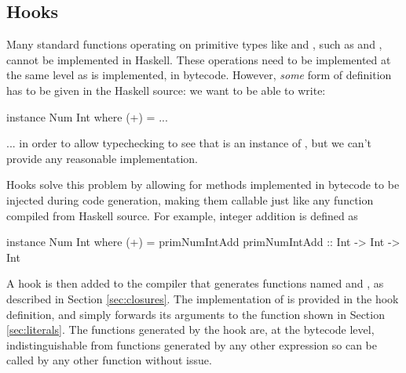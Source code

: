\documentclass[dissertation.tex]{subfiles}
\begin{document}
{    \subsection{Hooks}\label{sec:hooks}
    {

        Many standard functions operating on primitive types like  and , such as
        \haskell{(+)} and \haskell{(==)}, cannot be implemented in Haskell. These operations need to be implemented
        at the same level as  is implemented, in bytecode. However, \textit{some} form of definition
        has to be given in the Haskell source: we want to be able to write:

        \begin{haskellfigure}
        instance Num Int where
            (+) = ...
        \end{haskellfigure}

        ... in order to allow typechecking to see that  is an instance of , but we can't
        provide any reasonable implementation.

        Hooks solve this problem by allowing for methods implemented in bytecode to be injected during code
        generation, making them callable just like any function compiled from Haskell source. For example, integer
        addition is defined as 

        \begin{haskellfigure}
        instance Num Int where
            (+) = primNumIntAdd
        primNumIntAdd :: Int -> Int -> Int
        \end{haskellfigure}

        A hook is then added to the compiler that generates functions named  and
        , as described in Section \ref{sec:closures}. The implementation of
         is provided in the hook definition, and simply forwards its arguments to the
         function shown in Section \ref{sec:literals}. The functions generated by the hook are, at the
        bytecode level, indistinguishable from functions generated by any other expression so can be called by any
        other function without issue.

    }
}
\end{document}
